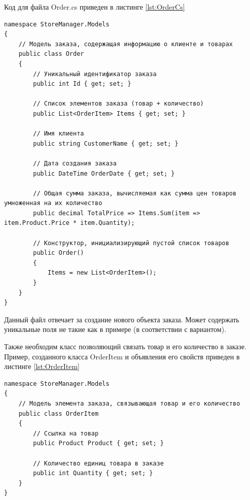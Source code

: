 \documentclass[12pt]{article}
\newcommand{\colorGIT}[1]{\textcolor{CtpGreen}{#1}}
\begin{document}
\noindent Код для файла Order.cs приведен в листинге \ref{lst:OrderCs}

\begin{lstlisting}[style=csharp_catppuccin, label={lst:OrderCs}, caption=Класс \colorGIT{\href{https://github.com/WebMasterIT/Csharp_Labs/blob/ec375afd16c0647b337cf3d8a79c8bef904fc1be/3lab/StoreManager/Models/Order.cs\#L1-L27}{Order.cs}}]
namespace StoreManager.Models
{
    // Модель заказа, содержащая информацию о клиенте и товарах
    public class Order
    {
        // Уникальный идентификатор заказа
        public int Id { get; set; }

        // Список элементов заказа (товар + количество)
        public List<OrderItem> Items { get; set; }

        // Имя клиента
        public string CustomerName { get; set; }

        // Дата создания заказа
        public DateTime OrderDate { get; set; }

        // Общая сумма заказа, вычисляемая как сумма цен товаров умноженная на их количество
        public decimal TotalPrice => Items.Sum(item => item.Product.Price * item.Quantity);

        // Конструктор, инициализирующий пустой список товаров
        public Order()
        {
            Items = new List<OrderItem>();
        }
    }
}
\end{lstlisting}

Данный файл отвечает за создание нового объекта заказа. Может содержать уникальные поля не такие как в примере (в соответствии с вариантом).


{}

Также необходим класс позволяющий связать товар и его количество в заказе. Пример, созданного класса OrderItem и объявления его свойств приведен в листинге \ref{lst:OrderItem}

\begin{lstlisting}[style=csharp_catppuccin, caption=Класс \colorGIT{\href{https://github.com/WebMasterIT/Csharp_Labs/blob/ec375afd16c0647b337cf3d8a79c8bef904fc1be/3lab/StoreManager/Models/OrderItem.cs\#L1-L12}{OrderItem}}, label=lst:OrderItem]
namespace StoreManager.Models
{
    // Модель элемента заказа, связывающая товар и его количество
    public class OrderItem
    {
        // Ссылка на товар
        public Product Product { get; set; }

        // Количество единиц товара в заказе
        public int Quantity { get; set; }
    }
}
\end{lstlisting}
\end{document}
